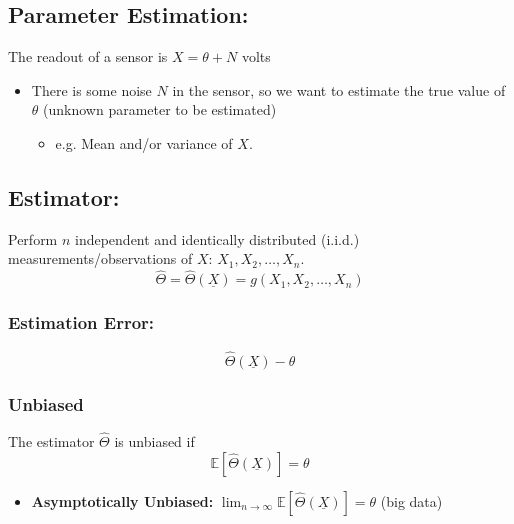 \subsection{Parameter Estimation:}
\begin{motivation}
    The readout of a sensor is $X = \theta + N$ volts
    \begin{itemize}
        \item There is some noise $N$ in the sensor, so we want to estimate the true value of $\theta$ (unknown parameter to be estimated)
        \begin{itemize}
            \item e.g. Mean and/or variance of $X$. 
        \end{itemize}
    \end{itemize}
\end{motivation}

\subsection{Estimator:}
\begin{definition}
    Perform $n$ independent and identically distributed (i.i.d.) measurements/observations of $X$: $X_1, X_2, \ldots, X_n$.
    \begin{equation}
        \hat{\Theta} = \hat{\Theta}(\underline{X}) = g(X_1, X_2, \ldots, X_n) 
    \end{equation}
\end{definition}

\subsubsection{Estimation Error:}
\begin{definition}
    \begin{equation}
        \hat{\Theta}(\underline{X}) - \theta
    \end{equation}
\end{definition}

\subsubsection{Unbiased}
\begin{definition}
    The estimator $\hat{\Theta}$ is unbiased if 
    \begin{equation}
        \mathbb{E}[\hat{\Theta}(\underline{X})] = \theta
    \end{equation}
    \begin{itemize}
        \item \textbf{Asymptotically Unbiased:} $\lim_{n \to \infty} \mathbb{E}[\hat{\Theta}(\underline{X})] = \theta$ (big data)
    \end{itemize}
\end{definition}

